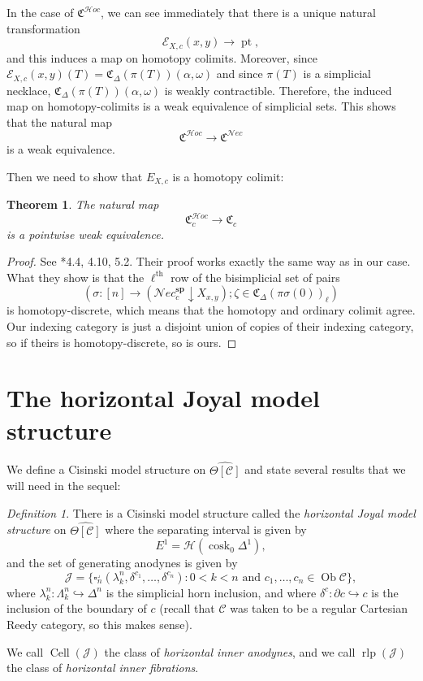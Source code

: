 \documentclass{amsart}
\numberwithin{equation}{section}
\theoremstyle{plain}   %
\newtheorem{thm}[subsection]{Theorem}
\theoremstyle{remark}
\newtheorem{defn}[subsection]{Definition}
\theoremstyle{plain}
\DeclareMathOperator{\Ob}{Ob}
\newcommand{\Nec}{\ensuremath{{\mathcal{N}ec}}}
\newcommand{\Hoc}{\ensuremath{{\mathcal{H}oc}}}
\newcommand{\overcat}[2]{{\left(#1\downarrow #2\right)}}
\newcommand{\C}{\ensuremath{\mathcal{C}}}
\DeclareMathOperator{\pt}{pt}
\newcommand{\cellset}{\ensuremath{\widehat{\Theta[\mathcal{C}]}}}
\begin{document}
In the case of \(\mathfrak{C}^\Hoc\), we can see immediately that there is a unique natural transformation \[\mathcal{E}_{X,c}(x,y)\to \pt,\] and this induces a map on homotopy colimits.  Moreover, since \(\mathcal{E}_{X,c}(x,y)(T)=\mathfrak{C}_\Delta(\pi(T))(\alpha,\omega)\) and since \(\pi(T)\) is a simplicial necklace,  \(\mathfrak{C}_\Delta(\pi(T))(\alpha,\omega)\) is weakly contractible. Therefore, the induced map on homotopy-colimits is a weak equivalence of simplicial sets.  This shows that the natural map \[\mathfrak{C}^\Hoc \to \mathfrak{C}^\Nec\] is a weak equivalence.

Then we need to show that \(E_{X,c}\) is a homotopy colimit:
\begin{thm}\label{necthm}
	The natural map \[\mathfrak{C}^\Hoc_c \to \mathfrak{C}_c\] is a pointwise weak equivalence.
\end{thm}
\begin{proof}
	See \cite{ds1}*{4.4, 4.10, 5.2}.  Their proof works exactly the same way as in our case.  What they show is that the \(\ell^\mathrm{th}\) row of the bisimplicial set of pairs 
	\[(\sigma:[n]\to \overcat{\Nec_c^\mathbf{sp}}{X_{x,y}}; \zeta \in \mathfrak{C}_\Delta(\pi\sigma(0))_\ell)\]
	is homotopy-discrete, which means that the homotopy and ordinary colimit agree.  Our indexing category is just a disjoint union of copies of their indexing category, so if theirs is homotopy-discrete, so is ours.
\end{proof}

\section{The horizontal Joyal model structure}
We define a Cisinski model structure on \(\cellset\) and state several results that we will need in the sequel:

\begin{defn}
	There is a Cisinski model structure called the \emph{horizontal Joyal model structure} on \(\cellset\) where the separating interval is given by 
	\[E^1=\mathscr{H}(\operatorname{cosk}_0 \Delta^1),\]
	and the set of generating anodynes is given by
	\[\mathscr{J}=\{\square_n^\lrcorner(\lambda^n_k,\delta^{c_1},\dots,\delta^{c_n}) : 0<k<n \text{ and } c_1,\dots,c_n \in \Ob \C\},\]
	where \(\lambda^n_k:\Lambda^n_k\hookrightarrow \Delta^n\) is the simplicial horn inclusion, and where \(\delta^c:\partial c \hookrightarrow c\) is the inclusion of the boundary of \(c\) (recall that \(\C\) was taken to be a regular Cartesian Reedy category, so this makes sense).

	We call \(\operatorname{Cell}(\mathscr{J})\) the class of \emph{horizontal inner anodynes}, and we call \(\operatorname{rlp}(\mathscr{J})\) the class of \emph{horizontal inner fibrations}.
\end{defn}
\end{document}
